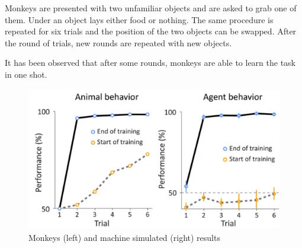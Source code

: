 \begin{casestudy}
    Monkeys are presented with two unfamiliar objects and are asked to grab one of them.
    Under an object lays either food or nothing.
    The same procedure is repeated for six trials and the position of the two objects can be swapped.
    After the round of trials, new rounds are repeated with new objects.

    It has been observed that after some rounds, monkeys are able to learn the task in one shot.

    \begin{figure}[H]
        \centering
        \includegraphics[width=0.4\linewidth]{./img/monkey_meta1.png}
        \caption{Monkeys (left) and machine simulated (right) results}
    \end{figure}
\end{casestudy}


